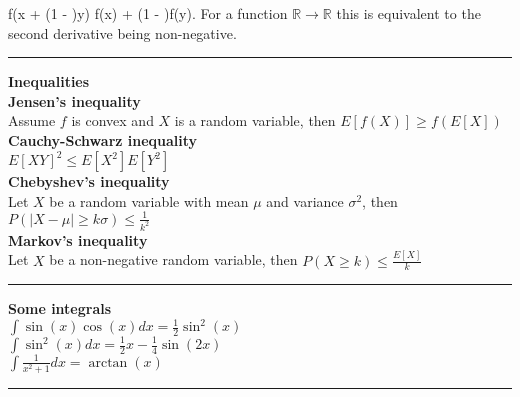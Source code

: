 \documentclass[10pt]{article} %
\begin{document}
\begin{multicols}{4}
{\begin{flushleft}
            f(\lambda x + (1 - \lambda)y) \leq \lambda f(x) + (1 - \lambda)f(y).
            \)
            For a function \(\mathbb{R} \to \mathbb{R}\) this is equivalent to the second derivative being non-negative.
            \vspace{0.1cm}
            \hrule
            \vspace{0.1cm}
            {\large \textbf{Inequalities}}\\
            \textbf{Jensen's inequality}\\
            Assume \(f\) is convex and \(X\) is a random variable, then
            \(
            E[f(X)] \geq f(E[X])
            \)\\
            \textbf{Cauchy-Schwarz inequality}\\
            \(
            E[XY]^2 \leq E[X^2]E[Y^2]
            \)\\
            \textbf{Chebyshev's inequality}\\
            Let \(X\) be a random variable with mean \(\mu\) and variance \(\sigma^2\), then
            \(
            P(|X-\mu| \geq k\sigma) \leq \frac{1}{k^2}
            \)\\
            \textbf{Markov's inequality}\\
            Let \(X\) be a non-negative random variable, then
            \(
            P(X \geq k) \leq \frac{E[X]}{k}
            \)\\
            \vspace{0.1cm}
            \hrule
            \vspace{0.1cm}
            \textbf{Some integrals}\\
            \(
            \int \sin(x)\cos(x)dx = \frac{1}{2}\sin^2(x)
            \)\\
            \(
            \int \sin^2(x)dx = \frac{1}{2}x - \frac{1}{4}\sin(2x)
            \)\\
            \(
            \int \frac{1}{x^2+1} dx = \arctan(x)
            \)
            \vspace{0.1cm}
            \hrule
            \vspace{0.1cm}


\end{flushleft}}
\end{multicols}
\end{document}
